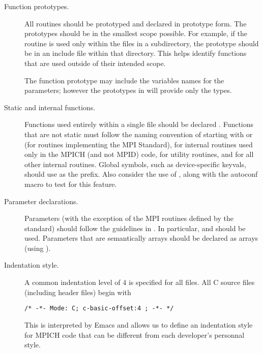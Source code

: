 \documentclass{article}
\begin{document}
\begin{description}
\item[Function prototypes.]
All routines should be prototyped and declared in prototype form.  The
prototypes should be in the 
smallest scope possible.  For example, if the routine is used only
within the files in a subdirectory, the prototype should be in an
include file within that directory.  This helps identify functions that are
used outside of their intended scope.

The function prototype may include the variables names for the parameters;
however the prototypes in  will provide only the types.

\item[Static and internal functions.]
Functions used entirely within a single file should be declared
.  Functions that are not static must follow the naming
convention of starting with  or  (for routines
implementing the MPI Standard),  for internal routines
used only in the MPICH (and not MPID) code,  for utility
routines, and  for all
other internal routines.  
Global symbols, such as device-specific keyvals, should use
 as the 
prefix.  Also consider the use of , along with the
autoconf macro  to test for this feature.

\item[Parameter declarations.]
Parameters (with the exception of the MPI routines defined by the
standard) should follow the guidelines in 
\cite{coding-standards}.  In 
particular,  and  should be used.
Parameters that are semantically arrays should be declared as arrays
(using \code{[]}).  

\item[Indentation style.]
A common indentation level of 4 is specified for all files.
All C source files (including header files) begin with 
\begin{verbatim}
/* -*- Mode: C; c-basic-offset:4 ; -*- */
\end{verbatim}
This is interpreted by Emacs and allows us to define an
indentation style for MPICH code 
that can be different from each developer's personnal style.


\end{description}
\end{document}
